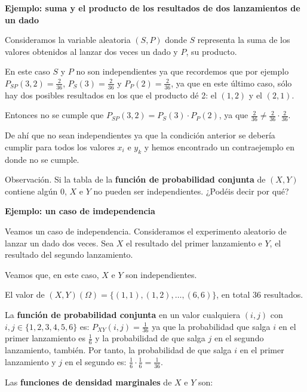 \documentclass[]{book}
\begin{document}
\textbf{Ejemplo: suma y el producto de los resultados de dos lanzamientos de un dado}

Consideramos la variable aleatoria \((S,P)\) donde \(S\) representa la suma de los valores obtenidos al lanzar dos veces un dado y \(P\), su producto.

En este caso \(S\) y \(P\) no son independientes ya que recordemos que por ejemplo \(P_{SP}(3,2)=\frac{2}{36}\), \(P_S(3)=\frac{2}{36}\) y \(P_P(2)=\frac{2}{36}\), ya que en este último caso, sólo hay dos posibles resultados en los que el producto dé 2: el \((1,2)\) y el \((2,1)\).

Entonces no se cumple que \(P_{SP}(3,2)=P_S(3)\cdot P_P(2)\), ya que \(\frac{2}{36}\neq \frac{2}{36}\cdot \frac{2}{36}\).

De ahí que no sean independientes ya que la condición anterior se debería cumplir para todos los valores \(x_i\) e \(y_k\) y hemos encontrado un contraejemplo en donde no se cumple.

Observación.
Si la tabla de la \textbf{función de probabilidad conjunta} de \((X,Y)\) contiene algún \(0\), \(X\) e \(Y\) no pueden ser independientes. ¿Podéis decir por qué?

\textbf{Ejemplo: un caso de imdependencia}

Veamos un caso de independencia. Consideramos el experimento aleatorio de lanzar un dado dos veces. Sea \(X\) el resultado del primer lanzamiento e \(Y\), el resultado del segundo lanzamiento.

Veamos que, en este caso, \(X\) e \(Y\) son independientes.

El valor de \((X,Y)(\Omega)=\{(1,1),(1,2),\ldots,(6,6)\}\), en total 36 resultados.

La \textbf{función de probabilidad conjunta} en un valor cualquiera \((i,j)\) con \(i,j\in\{1,2,3,4,5,6\}\) es:
\(P_{XY}(i,j)=\frac{1}{36}\) ya que la probabilidad que salga \(i\) en el primer lanzamiento es \(\frac{1}{6}\) y la probabilidad de que salga \(j\) en el segundo lanzamiento, también. Por tanto, la probabilidad de que salga \(i\) en el primer lanzamiento y \(j\) en el segundo es: \(\frac{1}{6}\cdot \frac{1}{6}=\frac{1}{36}.\)

Las \textbf{funciones de densidad marginales} de \(X\) e \(Y\) son:
\end{document}
